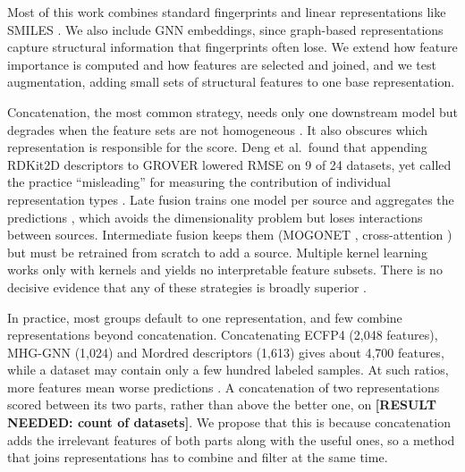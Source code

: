 
Most of this work combines standard fingerprints and linear representations like SMILES \citep{Xie2020, Laufktter2019}. We also include GNN embeddings, since graph-based representations capture structural information that fingerprints often lose. We extend how feature importance is computed and how features are selected and joined, and we test augmentation, adding small sets of structural features to one base representation.


Concatenation, the most common strategy, needs only one downstream model but degrades when the feature sets are not homogeneous \citep{Stahlschmidt2022}. It also obscures which representation is responsible for the score. Deng et al.\ found that appending RDKit2D descriptors to GROVER lowered RMSE on 9 of 24 datasets, yet called the practice ``misleading'' for measuring the contribution of individual representation types \citep{Deng2023}. Late fusion trains one model per source and aggregates the predictions \citep{Steyaert2023}, which avoids the dimensionality problem but loses interactions between sources. Intermediate fusion keeps them (MOGONET \citep{Wang2021}, cross-attention \citep{Beaude2025}) but must be retrained from scratch to add a source. Multiple kernel learning \citep{Gonen2011, Cichonska2018} works only with kernels and yields no interpretable feature subsets. There is no decisive evidence that any of these strategies is broadly superior \citep{Steyaert2023}.


In practice, most groups default to one representation, and few combine representations beyond concatenation. Concatenating ECFP4 (2,048 features), MHG-GNN (1,024) and Mordred descriptors (1,613) gives about 4,700 features, while a dataset may contain only a few hundred labeled samples. At such ratios, more features mean worse predictions \citep{Hughes1968, Bellman1961}. A concatenation of two representations scored between its two parts, rather than above the better one, on \textbf{[RESULT NEEDED: count of datasets]}. We propose that this is because concatenation adds the irrelevant features of both parts along with the useful ones, so a method that joins representations has to combine and filter at the same time.

